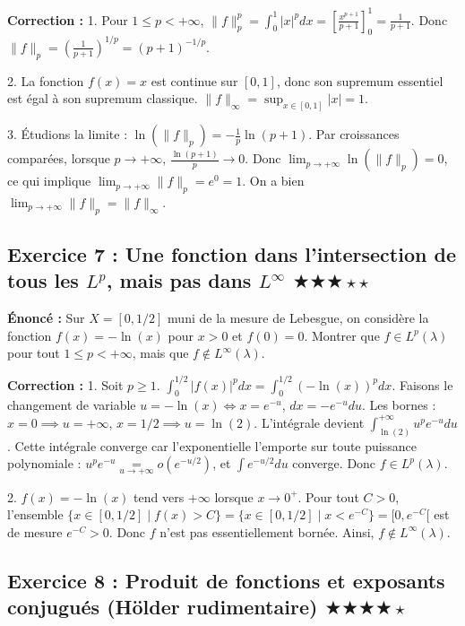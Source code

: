 \documentclass[11pt,a4paper]{article}
\begin{document}
\textbf{Correction :}
1. Pour $1 \le p < +\infty$, $\|f\|_p^p = \int_0^1 |x|^p dx = \left[ \frac{x^{p+1}}{p+1} \right]_0^1 = \frac{1}{p+1}$.
Donc $\|f\|_p = \left( \frac{1}{p+1} \right)^{1/p} = (p+1)^{-1/p}$.

2. La fonction $f(x) = x$ est continue sur $[0, 1]$, donc son supremum essentiel est égal à son supremum classique.
$\|f\|_\infty = \sup_{x \in [0,1]} |x| = 1$.

3. Étudions la limite :
$\ln(\|f\|_p) = -\frac{1}{p} \ln(p+1)$.
Par croissances comparées, lorsque $p \to +\infty$, $\frac{\ln(p+1)}{p} \to 0$.
Donc $\lim_{p \to +\infty} \ln(\|f\|_p) = 0$, ce qui implique $\lim_{p \to +\infty} \|f\|_p = e^0 = 1$.
On a bien $\lim_{p \to +\infty} \|f\|_p = \|f\|_\infty$.


\subsection*{Exercice 7 : Une fonction dans l'intersection de tous les $L^p$, mais pas dans $L^\infty$ \quad $\bigstar\bigstar\bigstar\star\star$}

\textbf{Énoncé :}
Sur $X = [0, 1/2]$ muni de la mesure de Lebesgue, on considère la fonction $f(x) = -\ln(x)$ pour $x > 0$ et $f(0) = 0$.
Montrer que $f \in L^p(\lambda)$ pour tout $1 \le p < +\infty$, mais que $f \notin L^\infty(\lambda)$.

\textbf{Correction :}
1. Soit $p \ge 1$.
$\int_0^{1/2} |f(x)|^p dx = \int_0^{1/2} (-\ln(x))^p dx$.
Faisons le changement de variable $u = -\ln(x) \iff x = e^{-u}$, $dx = -e^{-u} du$.
Les bornes : $x=0 \implies u = +\infty$, $x=1/2 \implies u = \ln(2)$.
L'intégrale devient $\int_{\ln(2)}^{+\infty} u^p e^{-u} du$.
Cette intégrale converge car l'exponentielle l'emporte sur toute puissance polynomiale : $u^p e^{-u} \underset{u \to +\infty}{=} o(e^{-u/2})$, et $\int e^{-u/2} du$ converge.
Donc $f \in L^p(\lambda)$.

2. $f(x) = -\ln(x)$ tend vers $+\infty$ lorsque $x \to 0^+$.
Pour tout $C > 0$, l'ensemble $\{x \in [0, 1/2] \mid f(x) > C\} = \{x \in [0, 1/2] \mid x < e^{-C}\} = [0, e^{-C}[$ est de mesure $e^{-C} > 0$.
Donc $f$ n'est pas essentiellement bornée. Ainsi, $f \notin L^\infty(\lambda)$.


\subsection*{Exercice 8 : Produit de fonctions et exposants conjugués (Hölder rudimentaire) \quad $\bigstar\bigstar\bigstar\bigstar\star$}
\end{document}
